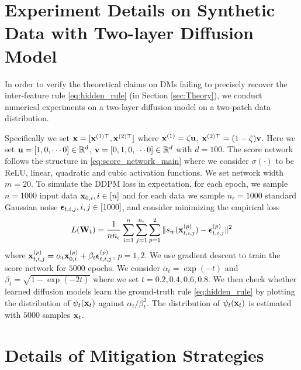 \section{Experiment Details on Synthetic Data with Two-layer Diffusion Model}
\label{app:synthe_two_layer}

In order to verify the theoretical claims on DMs failing to precisely recover the inter-feature rule \eqref{eq:hidden_rule} (in Section \ref{sec:Theory}), we conduct numerical experiments on a two-layer diffusion model on a two-patch data distribution.

Specifically we set ${\mathbf{x}} = [{\mathbf{x}}^{(1)\top}, {\mathbf{x}}^{(2)\top}]$ where ${\mathbf{x}}^{(1)} = \zeta {\mathbf u}$, ${\mathbf{x}}^{(2)\top} = (1-\zeta) {\mathbf v}$. Here we set ${\mathbf u} = [1, 0,\cdots0] \in {\mathbb{R}}^d$, ${\mathbf v} = [0,1,0,\cdots0] \in {\mathbb{R}}^d$ with $d = 100$. The score network follows the structure in \eqref{eq:score_network_main} where we consider $\sigma(\cdot)$ to be ReLU, linear, quadratic and cubic activation functions. We set network width $m = 20$. To simulate the DDPM loss in expectation, for each epoch, we sample $n = 1000$ input data ${\mathbf{x}}_{0,i}, i \in [n]$ and for each data we sample $n_\epsilon = 1000$ standard Gaussian noise ${\boldsymbol{\epsilon}}_{t,i,j}, i,j \in [1000]$, and consider minimizing the empirical loss 
\begin{equation*}
    L({\mathbf{W}}_t) = \frac{1}{n n_\epsilon} \sum_{i = 1}^n \sum_{j=1}^{n_\epsilon} \sum_{p=1}^2 \| s_w({\mathbf{x}}_{t,i,j}^{(p)}) - {\boldsymbol{\epsilon}}_{t,i,j}^{(p)} \|^2
\end{equation*}
where ${\mathbf{x}}_{t,i,j}^{(p)} = \alpha_t {\mathbf{x}}_{0,i}^{(p)} + \beta_t {\boldsymbol{\epsilon}}_{t,i,j}^{(p)}$, $p =1,2$. We use gradient descent to train the score network for $5000$ epochs. We consider $\alpha_t = \exp(-t)$ and $\beta_t = \sqrt{1-\exp(-2t)}$ where we set $t = 0.2, 0.4, 0.6, 0.8$. We then check whether learned diffusion models learn the ground-truth rule \eqref{eq:hidden_rule} by plotting the distribution of $\psi_t({\mathbf{x}}_t)$ against $\alpha_t/\beta_t^2$. The distribution of $\psi_t({\mathbf{x}}_t)$ is estimated with $5000$ samples ${\mathbf{x}}_t$. 


\section{Details of Mitigation Strategies}
